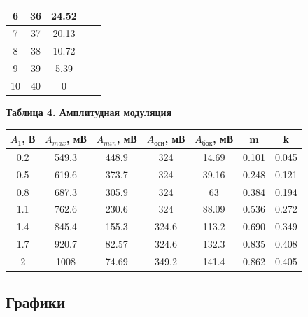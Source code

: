 \documentclass[15pt,a5paper,reqno]{article}
\begin{document}
\begin{center}
\begin{tabular}{|c|c|c|c|c|}
                        6    &             36 & 24.52                & &\\ \hline
                        7    &             37 & 20.13                & &\\ \hline
                        8    &             38 & 10.72                & &\\ \hline
                        9    &             39 & 5.39                 & &\\ \hline
                       10    &             40 & 0                    & &\\ \hline
            \end{tabular}
        \end{center}

        \noindent\hypertarget{table_4}{\textbf{Таблица 4. Амплитудная модуляция}}
        \begin{center}
            \begin{tabular}{|c|c||c|c|c|c|c|}
                \hline
                $A_1$, В & $A_{max}$, мВ & $A_{min}$, мВ & $A_{\text{осн}}$, мВ & $A_{\text{бок}}$, мВ & m & k\\ \hline\hline
                0.2 & 549.3 & 448.9 & 324   & 14.69 & 0.101 & 0.045 \\ \hline
                0.5 & 619.6 & 373.7 & 324   & 39.16 & 0.248 & 0.121 \\ \hline
                0.8 & 687.3 & 305.9 & 324   & 63    & 0.384 & 0.194 \\ \hline
                1.1 & 762.6 & 230.6 & 324   & 88.09 & 0.536 & 0.272 \\ \hline
                1.4 & 845.4 & 155.3 & 324.6 & 113.2 & 0.690 & 0.349 \\ \hline
                1.7 & 920.7 & 82.57 & 324.6 & 132.3 & 0.835 & 0.408 \\ \hline
                2   & 1008  & 74.69 & 349.2 & 141.4 & 0.862 & 0.405 \\ \hline
            \end{tabular}
        \end{center}

    \newpage
    \subsection{Графики}
\end{document}
